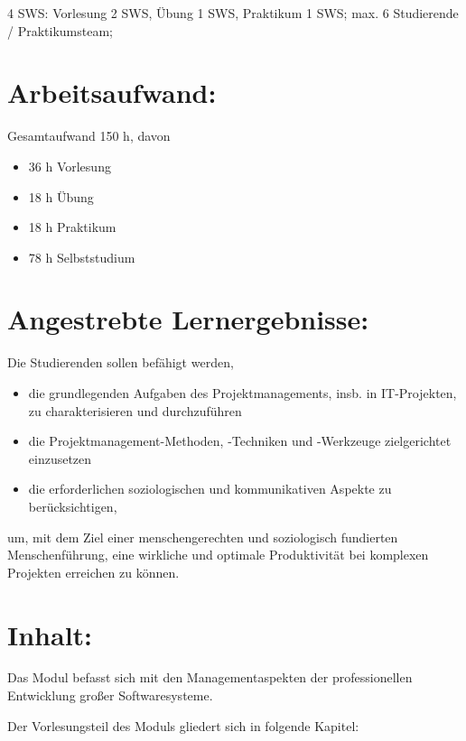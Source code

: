 4 SWS: Vorlesung 2 SWS, Übung 1 SWS, Praktikum 1 SWS; max. 6 Studierende
/ Praktikumsteam;

\section*{Arbeitsaufwand:}\label{arbeitsaufwand-13}

Gesamtaufwand 150 h, davon

\begin{itemize}
\item
  36 h Vorlesung
\item
  18 h Übung
\item
  18 h Praktikum
\item
  78 h Selbststudium
\end{itemize}

\section*{Angestrebte
Lernergebnisse:}\label{angestrebte-lernergebnisse-20}

Die Studierenden sollen befähigt werden,

\begin{itemize}
\item
  die grundlegenden Aufgaben des Projektmanagements, insb. in
  IT-Projekten, zu charakterisieren und durchzuführen
\item
  die Projektmanagement-Methoden, -Techniken und -Werkzeuge
  zielgerichtet einzusetzen
\item
  die erforderlichen soziologischen und kommunikativen Aspekte zu
  berücksichtigen,
\end{itemize}

um, mit dem Ziel einer menschengerechten und soziologisch fundierten
Menschenführung, eine wirkliche und optimale Produktivität bei komplexen
Projekten erreichen zu können.

\section*{Inhalt:}\label{inhalt-20}

Das Modul befasst sich mit den Managementaspekten der professionellen
Entwicklung großer Softwaresysteme.

Der Vorlesungsteil des Moduls gliedert sich in folgende Kapitel:

